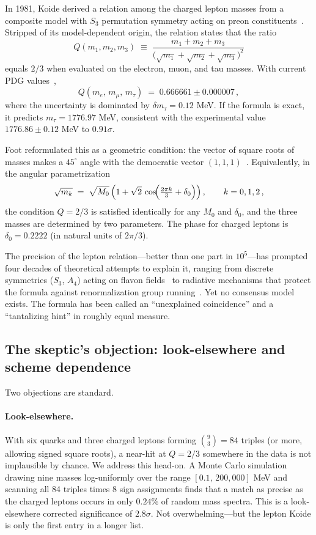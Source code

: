 \documentclass[12pt,a4paper]{article}
\begin{document}
In 1981, Koide derived a relation among the charged lepton masses from a composite model
with $S_3$ permutation symmetry acting on preon constituents~\cite{Koide1983}.  Stripped of its
model-dependent origin, the relation states that the ratio
\begin{equation}
\boxed{Q(m_1,m_2,m_3) \;\equiv\; \frac{m_1+m_2+m_3}{\bigl(\sqrt{m_1}+\sqrt{m_2}+\sqrt{m_3}\bigr)^2}}
\end{equation}
equals $2/3$ when evaluated on the electron, muon, and tau masses.  With current PDG
values~\cite{PDG2024},
\begin{equation}
Q(m_e,\,m_\mu,\,m_\tau) \;=\; 0.666661 \pm 0.000007\,,
\end{equation}
where the uncertainty is dominated by $\delta m_\tau = 0.12$ MeV.  If the formula is
exact, it predicts $m_\tau = 1776.97$ MeV, consistent with the experimental value
$1776.86 \pm 0.12$ MeV to $0.91\sigma$.

Foot reformulated this as a geometric condition: the vector of square roots of masses
makes a $45^\circ$ angle with the democratic vector $(1,1,1)$~\cite{Foot1994}.  Equivalently, in the
angular parametrization
\begin{equation}
\sqrt{m_k} \;=\; \sqrt{M_0}\,\Bigl(1 + \sqrt{2}\,\cos\!\Bigl(\tfrac{2\pi k}{3}+\delta_0\Bigr)\Bigr)\,,
\qquad k=0,1,2\,,
\end{equation}
the condition $Q=2/3$ is satisfied identically for any $M_0$ and $\delta_0$, and the
three masses are determined by two parameters.  The phase for charged leptons is
$\delta_0 = 0.2222$ (in natural units of $2\pi/3$).

The precision of the lepton relation---better than one part in $10^5$---has prompted
four decades of theoretical attempts to explain it, ranging from discrete symmetries
($S_3$, $A_4$) acting on flavon fields~\cite{Koide1990,Ma2006} to radiative mechanisms that protect
the formula against renormalization group running~\cite{XZZ2008}.  Yet no consensus model exists.
The formula has been called an ``unexplained coincidence'' and a ``tantalizing hint''
in roughly equal measure.

\subsection{The skeptic's objection: look-elsewhere and scheme dependence}

Two objections are standard.

\paragraph{Look-elsewhere.}  With six quarks and three charged leptons forming
$\binom{9}{3} = 84$ triples (or more, allowing signed square roots), a near-hit at
$Q=2/3$ somewhere in the data is not implausible by chance.  We address this head-on.
A Monte Carlo simulation drawing nine masses log-uniformly over the range
$[0.1,\,200{,}000]$ MeV and scanning all 84 triples times 8 sign assignments finds that
a match as precise as the charged leptons occurs in only $0.24\%$ of random mass
spectra.  This is a look-elsewhere corrected significance of $2.8\sigma$.  Not
overwhelming---but the lepton Koide is only the first entry in a longer list.
\end{document}
